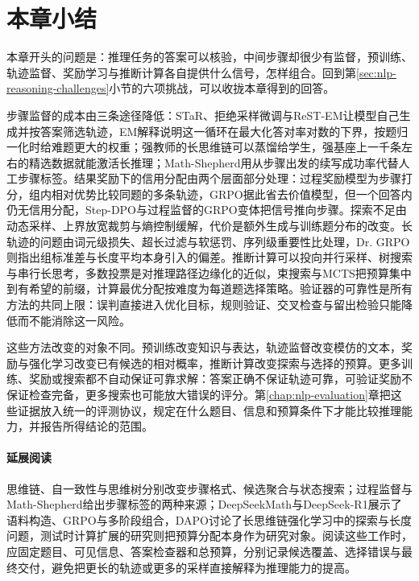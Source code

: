 \section{本章小结}
\label{sec:nlp-reasoning-summary}

本章开头的问题是：推理任务的答案可以核验，中间步骤却很少有监督，预训练、轨迹监督、奖励学习与推断计算各自提供什么信号，怎样组合。回到第\ref{sec:nlp-reasoning-challenges}小节的六项挑战，可以收拢本章得到的回答。

步骤监督的成本由三条途径降低：STaR、拒绝采样微调与ReST-EM让模型自己生成并按答案筛选轨迹，EM解释说明这一循环在最大化答对率对数的下界，按题归一化时给难题更大的权重；强教师的长思维链可以蒸馏给学生，强基座上一千条左右的精选数据就能激活长推理；Math-Shepherd用从步骤出发的续写成功率代替人工步骤标签。结果奖励下的信用分配由两个层面部分处理：过程奖励模型为步骤打分，组内相对优势比较同题的多条轨迹，GRPO据此省去价值模型，但一个回答内仍无信用分配，Step-DPO与过程监督的GRPO变体把信号推向步骤。探索不足由动态采样、上界放宽裁剪与熵控制缓解，代价是额外生成与训练题分布的改变。长轨迹的问题由词元级损失、超长过滤与软惩罚、序列级重要性比处理，Dr. GRPO则指出组标准差与长度平均本身引入的偏差。推断计算可以投向并行采样、树搜索与串行长思考，多数投票是对推理路径边缘化的近似，束搜索与MCTS把预算集中到有希望的前缀，计算最优分配按难度为每道题选择策略。验证器的可靠性是所有方法的共同上限：误判直接进入优化目标，规则验证、交叉检查与留出检验只能降低而不能消除这一风险。

这些方法改变的对象不同。预训练改变知识与表达，轨迹监督改变模仿的文本，奖励与强化学习改变已有候选的相对概率，推断计算改变探索与选择的预算。更多训练、奖励或搜索都不自动保证可靠求解：答案正确不保证轨迹可靠，可验证奖励不保证检查完备，更多搜索也可能放大错误的评分。第\ref{chap:nlp-evaluation}章把这些证据放入统一的评测协议，规定在什么题目、信息和预算条件下才能比较推理能力，并报告所得结论的范围。

\paragraph{延展阅读}
思维链、自一致性与思维树分别改变步骤格式、候选聚合与状态搜索；过程监督与Math-Shepherd给出步骤标签的两种来源；DeepSeekMath与DeepSeek-R1展示了语料构造、GRPO与多阶段组合，DAPO讨论了长思维链强化学习中的探索与长度问题，测试时计算扩展的研究则把预算分配本身作为研究对象。阅读这些工作时，应固定题目、可见信息、答案检查器和总预算，分别记录候选覆盖、选择错误与最终交付，避免把更长的轨迹或更多的采样直接解释为推理能力的提高。
